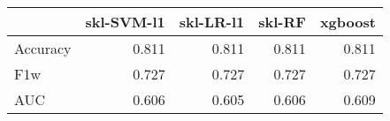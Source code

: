 \begin{tabular}{lrrrr}
\toprule
{} &  skl-SVM-l1 &  skl-LR-l1 &  skl-RF &  xgboost \\
\midrule
Accuracy &       0.811 &      0.811 &   0.811 &    0.811 \\
F1w      &       0.727 &      0.727 &   0.727 &    0.727 \\
AUC      &       0.606 &      0.605 &   0.606 &    0.609 \\
\bottomrule
\end{tabular}
